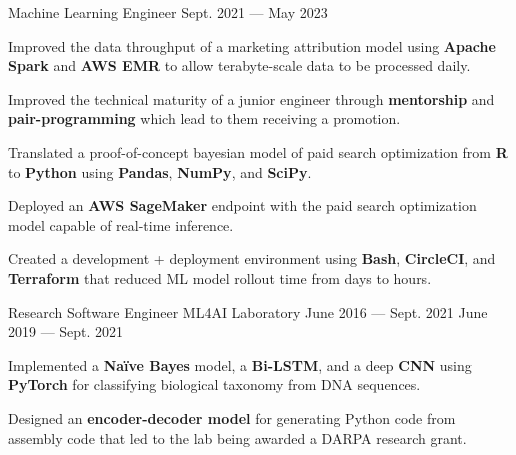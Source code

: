 \begin{cventries}
  \cventry
    {Machine Learning Engineer} %
    {} %
    {} %
    {Sept. 2021 --- May 2023} %
    {
      \vspace{-0.1cm}
      \begin{cvitems} %
        \item Improved the data throughput of a marketing attribution model using \textbf{Apache Spark} and \textbf{AWS EMR} to allow terabyte-scale data to be processed daily.
        \item Improved the technical maturity of a junior engineer through \textbf{mentorship} and \textbf{pair-programming} which lead to them receiving a promotion.
        \item Translated a proof-of-concept bayesian model of paid search optimization from \textbf{R} to \textbf{Python} using \textbf{Pandas}, \textbf{NumPy}, and \textbf{SciPy}.
        \item Deployed an \textbf{AWS SageMaker} endpoint with the paid search optimization model capable of real-time inference.
        \item Created a development + deployment environment using \textbf{Bash}, \textbf{CircleCI}, and \textbf{Terraform} that reduced ML model rollout time from days to hours.
      \end{cvitems}
    }
  \vspace{.2cm}
  \cventry
    {Research Software Engineer} %
    {ML4AI Laboratory} %
    {June 2016 --- Sept. 2021} %
    {June 2019 --- Sept. 2021} %
    {
      \vspace{-0.1cm}
      \begin{cvitems} %
        \item Implemented a \textbf{Naïve Bayes} model, a \textbf{Bi-LSTM}, and a deep \textbf{CNN} using \textbf{PyTorch} for classifying biological taxonomy from DNA sequences.
        \item Designed an \textbf{encoder-decoder model} for generating Python  code from assembly code that led to the lab being awarded a DARPA research grant.

\end{cvitems}}
\end{cventries}
